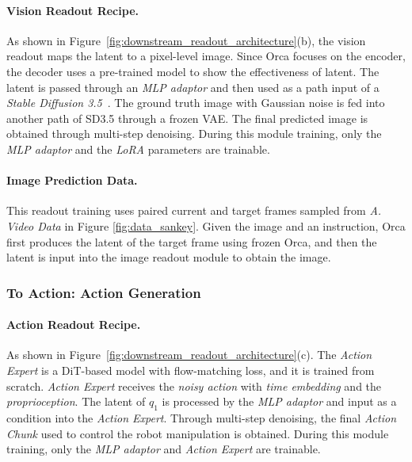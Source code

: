 \documentclass{llmxive}
\begin{document}
\paragraph{Vision Readout Recipe.} 

As shown in Figure~\ref{fig:downstream_readout_architecture}(b), the vision readout maps the latent to a pixel-level image. Since Orca focuses on the encoder, the decoder uses a pre-trained model to show the effectiveness of latent.
The latent is passed through an \textit{MLP adaptor} and then used as a path input of a \textit{Stable Diffusion 3.5}~\citep{sd35}. The ground truth image with Gaussian noise is fed into another path of SD3.5 through a frozen VAE. The final predicted image is obtained through multi-step denoising. During this module training, only the \textit{MLP adaptor} and the \textit{LoRA} parameters are trainable. 
% 


\paragraph{Image Prediction Data.}
This readout training uses paired current and target frames sampled from \textit{A. Video Data} in Figure \ref{fig:data_sankey}. Given the image and an instruction, Orca first produces the latent of the target frame using frozen Orca, and then the latent is input into the image readout module to obtain the image.


\subsubsection{To Action: Action Generation} 
\label{sec:downstream_action} 

\paragraph{Action Readout Recipe.} 
As shown in Figure~\ref{fig:downstream_readout_architecture}(c). 
The \textit{Action Expert} is a DiT-based model with flow-matching loss, and it is trained from scratch. \textit{Action Expert} receives the \textit{noisy action} with \textit{time embedding} and the \textit{proprioception}. The latent of $q_1$ is processed by the \textit{MLP adaptor} and input as a condition into the \textit{Action Expert}. Through multi-step denoising, the final \textit{Action Chunk} used to control the robot manipulation is obtained.
During this module training, only the \textit{MLP adaptor} and \textit{Action Expert} are trainable. 
\end{document}
